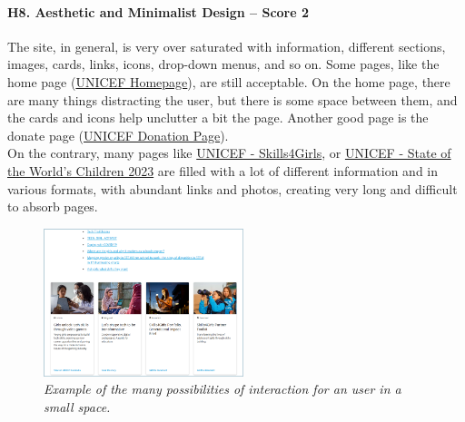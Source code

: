 \paragraph*{H8. Aesthetic and Minimalist Design – Score 2}
The site, in general, is very over saturated with information, different sections, images, cards, links, icons, drop-down menus, and so on. Some pages, like the home page (\href{https://www.unicef.org/}{UNICEF Homepage}), are still acceptable. On the home page, there are many things distracting the user, but there is some space between them, and the cards and icons help unclutter a bit the page. Another good page is the donate page (\href{https://donazioni.unicef.it/}{UNICEF Donation Page}).\\
On the contrary, many pages like \href{https://www.unicef.org/gender-equality/skills4girls}{UNICEF - Skills4Girls}, or \href{https://www.unicef.org/reports/state-worlds-children-2023#SOWC}{UNICEF - State of the World's Children 2023} are filled with a lot of different information and in various formats, with abundant links and photos, creating very long and difficult to absorb pages.
\begin{figure}[h]
	\centering
	\begin{center}
		\includegraphics[width=0.52\textwidth]{Picture12.png}
	\end{center}
	\captionsetup{font=small}
	\caption{\textit{Example of the many possibilities of interaction for an user in a small space.}}
	\label{fig:label12}
\end{figure}

